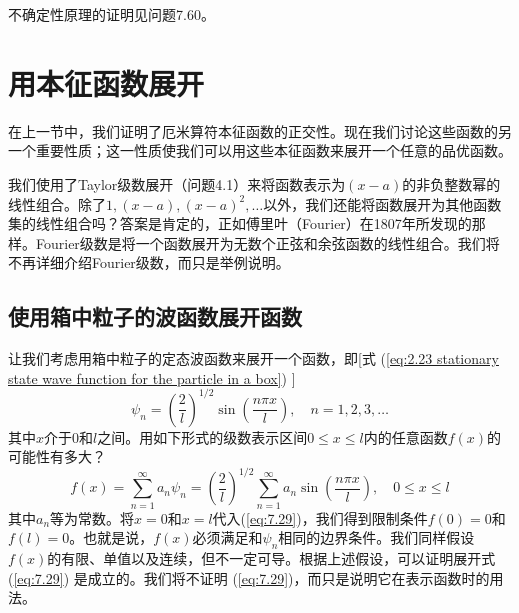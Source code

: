     不确定性原理的证明见问题7.60。

\section{用本征函数展开}
\label{sec:7.3 Expansion in Terms of Eigenfunctions}
    在上一节中，我们证明了厄米算符本征函数的正交性。现在我们讨论这些函数的另一个重要性质；这一性质使我们可以用这些本征函数来展开一个任意的品优函数。

    我们使用了Taylor级数展开（问题4.1）来将函数表示为$\left(x-a\right)$的非负整数幂的线性组合。除了$1,\left(x-a\right),\left(x-a\right)^2,\ldots$以外，我们还能将函数展开为其他函数集的线性组合吗？答案是肯定的，正如傅里叶（Fourier）在1807年所发现的那样。Fourier级数是将一个函数展开为无数个正弦和余弦函数的线性组合。我们将不再详细介绍Fourier级数，而只是举例说明。

\subsection*{使用箱中粒子的波函数展开函数}

    让我们考虑用箱中粒子的定态波函数来展开一个函数，即[式 (\ref{eq:2.23 stationary state wave function for the particle in a box}) ]
    \begin{equation}
        \psi_n = \left(\frac{2}{l}\right)^{1/2} \sin\left(\frac{n\pi x}{l}\right), \quad n = 1,2,3,\ldots
        \label{eq:7.28}
    \end{equation}
    其中$x$介于$0$和$l$之间。用如下形式的级数表示区间$0 \leq x \leq l$内的任意函数$f\left(x\right)$的可能性有多大？
    \begin{equation}
        f\left(x\right) = \sum_{n=1}^{\infty} a_n\psi_n = \left(\frac{2}{l}\right)^{1/2} \sum_{n=1}^{\infty} a_n \sin\left(\frac{n\pi x}{l}\right), \quad 0 \leq x \leq l
        \label{eq:7.29}
    \end{equation}
    其中$a_n$等为常数。将$x=0$和$x=l$代入(\ref{eq:7.29})，我们得到限制条件$f\left(0\right)=0$和$f\left(l\right)=0$。也就是说，$f\left(x\right)$必须满足和$\psi_n$相同的边界条件。我们同样假设$f\left(x\right)$的有限、单值以及连续，但不一定可导。根据上述假设，可以证明展开式 (\ref{eq:7.29}) 是成立的。我们将不证明 (\ref{eq:7.29})，而只是说明它在表示函数时的用法。

